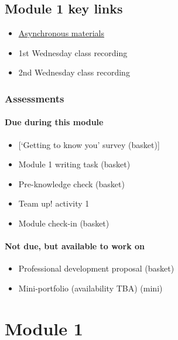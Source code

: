 \documentclass[
  openany]{book}
\providecommand{\tightlist}{%
  \setlength{\itemsep}{0pt}\setlength{\parskip}{0pt}}
\begin{document}
\hypertarget{module-1-key-links}{%
\section{Module 1 key links}\label{module-1-key-links}}

\begin{itemize}
\tightlist
\item
  \protect\hyperlink{m1}{Asynchronous materials}
\item
  1st Wednesday class recording
\item
  2nd Wednesday class recording
\end{itemize}

\hypertarget{assessments-1}{%
\subsection{Assessments}\label{assessments-1}}

\hypertarget{due-during-this-module}{%
\subsubsection{Due during this module}\label{due-during-this-module}}

\begin{itemize}
\tightlist
\item
  {[}`Getting to know you' survey (basket){]}
\item
  Module 1 writing task (basket)
\item
  Pre-knowledge check (basket)
\item
  Team up! activity 1
\item
  Module check-in (basket)
\end{itemize}

\hypertarget{not-due-but-available-to-work-on}{%
\subsubsection{Not due, but available to work on}\label{not-due-but-available-to-work-on}}

\begin{itemize}
\tightlist
\item
  Professional development proposal (basket)
\item
  Mini-portfolio (availability TBA) (mini)
\end{itemize}

\hypertarget{m1}{%
\chapter{Module 1}\label{m1}}
\end{document}

